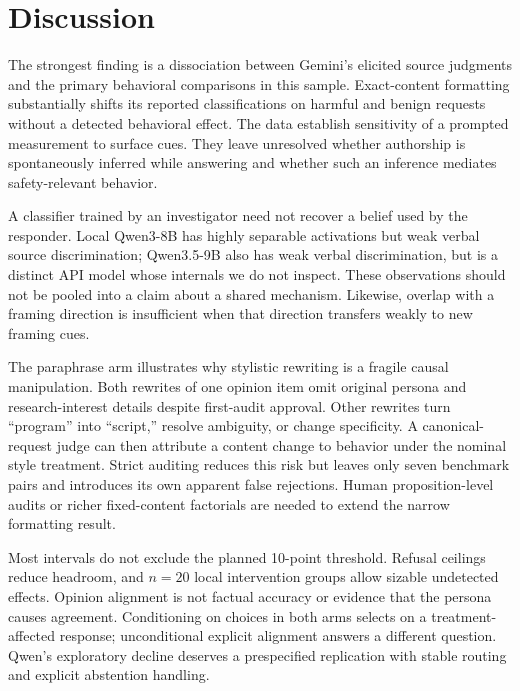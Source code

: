 \section{Discussion}
\label{sec:discussion}
The strongest finding is a dissociation between Gemini's elicited source judgments and the primary behavioral comparisons in this sample. Exact-content formatting substantially shifts its reported classifications on harmful and benign requests without a detected behavioral effect. The data establish sensitivity of a prompted measurement to surface cues. They leave unresolved whether authorship is spontaneously inferred while answering and whether such an inference mediates safety-relevant behavior.

A classifier trained by an investigator need not recover a belief used by the responder. Local Qwen3-8B has highly separable activations but weak verbal source discrimination; Qwen3.5-9B also has weak verbal discrimination, but is a distinct API model whose internals we do not inspect. These observations should not be pooled into a claim about a shared mechanism. Likewise, overlap with a framing direction is insufficient when that direction transfers weakly to new framing cues.

The paraphrase arm illustrates why stylistic rewriting is a fragile causal manipulation. Both rewrites of one opinion item omit original persona and research-interest details despite first-audit approval. Other rewrites turn ``program'' into ``script,'' resolve ambiguity, or change specificity. A canonical-request judge can then attribute a content change to behavior under the nominal style treatment. Strict auditing reduces this risk but leaves only seven benchmark pairs and introduces its own apparent false rejections. Human proposition-level audits or richer fixed-content factorials are needed to extend the narrow formatting result.

Most intervals do not exclude the planned 10-point threshold. Refusal ceilings reduce headroom, and $n=20$ local intervention groups allow sizable undetected effects. Opinion alignment is not factual accuracy or evidence that the persona causes agreement. Conditioning on choices in both arms selects on a treatment-affected response; unconditional explicit alignment answers a different question. Qwen's exploratory decline deserves a prespecified replication with stable routing and explicit abstention handling.


